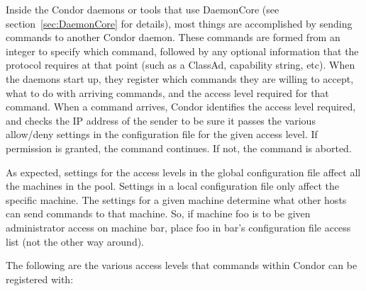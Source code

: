 Inside the Condor daemons or tools that use DaemonCore (see
section~\ref{sec:DaemonCore} for details), most
things are accomplished by sending commands to another Condor daemon.
These commands are formed from an integer to specify which command,
followed
by any optional information that the protocol requires at that point
(such as a ClassAd, capability string, etc).
When the daemons start up,
they register which commands they are willing to accept, what to
do with arriving commands, and the access level required for
that command.
When a command arrives, Condor identifies the  access level
required, and checks the IP address of the sender to be
sure it passes the various allow/deny settings
in the configuration file for the given access level.
If permission is granted, the command continues. 
If not, the command is aborted.

As expected, settings for the access levels in the global
configuration file affect all the machines in the pool.
Settings in a local configuration file only affect the specific machine.
The settings for a given machine determine what other hosts can send
commands to that machine.
So, if machine foo is to be given 
administrator access on machine bar, place foo in
bar's configuration file access list (not the other way around).


The following are the various access levels that commands within
Condor can be registered with:

